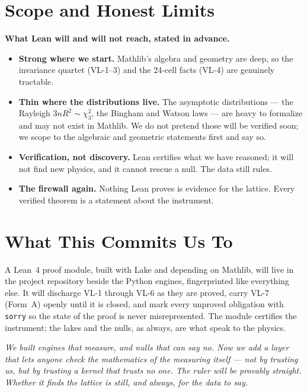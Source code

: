 \documentclass[11pt, letterpaper, openany]{book}
\begin{document}
\section{Scope and Honest Limits}

\begin{correctionbox}
\textbf{What Lean will and will not reach, stated in advance.}
\begin{itemize}
    \item \textbf{Strong where we start.} Mathlib's algebra and geometry are deep, so the invariance
          quartet (VL-1--3) and the 24-cell facts (VL-4) are genuinely tractable.
    \item \textbf{Thin where the distributions live.} The asymptotic distributions --- the Rayleigh
          $3nR^2 \sim \chi^2_3$, the Bingham and Watson laws --- are heavy to formalize and may not
          exist in Mathlib. We do not pretend those will be verified soon; we scope to the algebraic
          and geometric statements first and say so.
    \item \textbf{Verification, not discovery.} Lean certifies what we have reasoned; it will not find
          new physics, and it cannot rescue a null. The data still rules.
    \item \textbf{The firewall again.} Nothing Lean proves is evidence for the lattice. Every verified
          theorem is a statement about the instrument.
\end{itemize}
\end{correctionbox}

\section{What This Commits Us To}

\begin{predictionbox}
A Lean~4 proof module, built with Lake and depending on Mathlib, will live in the project repository
beside the Python engines, fingerprinted like everything else. It will discharge VL-1 through VL-6 as
they are proved, carry VL-7 (Form~A) openly until it is closed, and mark every unproved obligation
with \texttt{sorry} so the state of the proof is never misrepresented. The module certifies the
instrument; the lakes and the nulls, as always, are what speak to the physics.
\end{predictionbox}

\begin{center}
\vspace{0.5em}
\itshape
We built engines that measure, and nulls that can say no. Now we add a layer that lets anyone check
the mathematics of the measuring itself --- not by trusting us, but by trusting a kernel that trusts
no one. The ruler will be provably straight. Whether it finds the lattice is still, and always, for
the data to say.
\vspace{0.5em}
\end{center}
\end{document}
